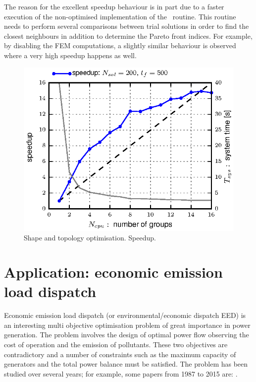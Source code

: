 \documentclass[final,5p,times,twocolumn]{elsarticle}
\begin{document}
The reason for the excellent speedup behaviour is in part due to a faster execution of the
non-optimised implementation of the \FnMetrics~routine. This routine needs to perform several
comparisons between trial solutions in order to find the closest neighbours in addition to determine
the Pareto front indices. For example, by disabling the FEM computations, a slightly similar
behaviour is observed where a very high speedup happens as well.

\begin{figure} \centering
\includegraphics[scale=1]{./figs/res/topology-speedup.eps}
\caption{Shape and topology optimisation. Speedup.}
\label{fig:topoSpeedup}
\end{figure}



\section{Application: economic emission load dispatch}
\label{sec:economic}

Economic emission load dispatch (or environmental/economic dispatch EED) is an interesting multi
objective optimisation problem of great importance in power generation. The problem involves the
design of optimal power flow observing the cost of operation and the emission of pollutants. These
two objectives are contradictory and a number of constraints such as the maximum capacity of
generators and the total power balance must be satisfied. The problem has been studied over several
years; for example, some papers from 1987 to 2015 are: \citep{yokoyama:87, farag:95, abido:03,
abido:06, alra:06, kumar:09, dhana:11, bayon:12, rahmat:13, li:13, jubril:13, bilil:14, jeddi:14,
jubril:14, sayah:14, bhatta:15, zhang:15}.
\end{document}
